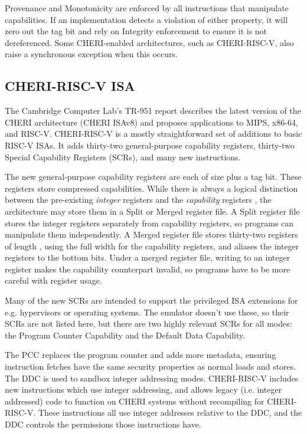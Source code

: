 Provenance and Monotonicity are enforced by all instructions that manipulate capabilities.
If an implementation detects a violation of either property, it will zero out the tag bit and rely on Integrity enforcement to ensure it is not dereferenced.
Some CHERI-enabled architectures, such as CHERI-RISC-V, also raise a synchronous exception when this occurs.

\subsection{CHERI-RISC-V ISA}
The Cambridge Computer Lab's TR-951 report describes the latest version of the CHERI architecture (CHERI ISAv8) and proposes applications to MIPS, x86-64, and RISC-V.
CHERI-RISC-V is a mostly straightforward set of additions to basic RISC-V ISAs.
It adds thirty-two general-purpose capability registers, thirty-two Special Capability Registers (SCRs), and many new instructions.

The new general-purpose capability registers are each of size  plus a tag bit.
These registers store compressed capabilities.
While there is always a logical distinction between the pre-existing \emph{integer} registers  and the \emph{capability} registers , the architecture may store them in a Split or Merged register file.
A Split register file stores the integer registers separately from capability registers, so programs can manipulate them independently.
A Merged register file stores thirty-two registers of length , using the full width for the capability registers, and aliases the integer registers to the bottom  bits.
Under a merged register file, writing to an integer register makes the capability counterpart invalid, so programs have to be more careful with register usage.


Many of the new SCRs are intended to support the privileged ISA extensions for e.g. hypervisors or operating systems.
The emulator doesn't use these, so their SCRs are not listed here, but there are two highly relevant SCRs for all modes: the Program Counter Capability and the Default Data Capability.

The PCC replaces the program counter and adds more metadata, ensuring instruction fetches have the same security properties as normal loads and stores.
The DDC is used to sandbox integer addressing modes.
CHERI-RISC-V includes new instructions which use integer addressing, and allows legacy (i.e. integer addressed) code to function on CHERI systems without recompiling for CHERI-RISC-V.
These instructions all use integer addresses relative to the DDC, and the DDC controls the permissions those instructions have.

